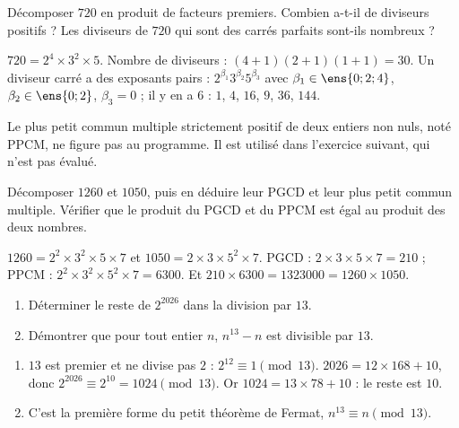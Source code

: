 \begin{exercise}
Décomposer $720$ en produit de facteurs premiers. Combien a-t-il de diviseurs positifs ? Les diviseurs de $720$ qui sont des carrés parfaits sont-ils nombreux ?
\end{exercise}
\begin{solution}
$720=2^4\times3^2\times5$. Nombre de diviseurs : $(4+1)(2+1)(1+1)=30$. Un diviseur carré a des exposants pairs : $2^{\beta_1}3^{\beta_2}5^{\beta_3}$ avec $\beta_1\in\ens{0;2;4}$, $\beta_2\in\ens{0;2}$, $\beta_3=0$ ; il y en a $6$ : $1$, $4$, $16$, $9$, $36$, $144$.
\end{solution}

\begin{beyond}Le plus petit commun multiple strictement positif de deux entiers non nuls, noté PPCM, ne figure pas au programme. Il est utilisé dans l'exercice suivant, qui n'est pas évalué.\end{beyond}
\begin{exercise}
Décomposer $\num{1260}$ et $\num{1050}$, puis en déduire leur PGCD et leur plus petit commun multiple. Vérifier que le produit du PGCD et du PPCM est égal au produit des deux nombres.
\end{exercise}
\begin{solution}
$\num{1260}=2^2\times3^2\times5\times7$ et $\num{1050}=2\times3\times5^2\times7$. PGCD : $2\times3\times5\times7=210$ ; PPCM : $2^2\times3^2\times5^2\times7=\num{6300}$. Et $210\times\num{6300}=\num{1323000}=\num{1260}\times\num{1050}$.
\end{solution}

\begin{exercise}
\begin{enumerate}
\item Déterminer le reste de $2^{2026}$ dans la division par $13$.
\item Démontrer que pour tout entier $n$, $n^{13}-n$ est divisible par $13$.
\end{enumerate}
\end{exercise}
\begin{solution}
\begin{enumerate}
\item $13$ est premier et ne divise pas $2$ : $2^{12}\equiv1\pmod{13}$. $\num{2026}=12\times168+10$, donc $2^{2026}\equiv2^{10}=\num{1024}\pmod{13}$. Or $\num{1024}=13\times78+10$ : le reste est $10$.
\item C'est la première forme du petit théorème de Fermat, $n^{13}\equiv n\pmod{13}$.
\end{enumerate}
\end{solution}

